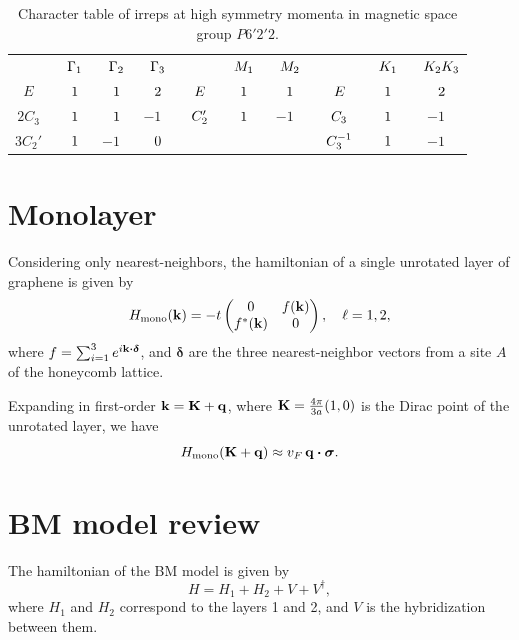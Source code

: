 \documentclass[12pt]{report}
\begin{document}
\begin{table}[H]
\caption{Character table of irreps at high symmetry momenta in magnetic space group $P6'2'2$.}
\centering
\begin{tabular} { c c c c | c c c | c c c }
\cline{1-10}
$\P$ & $\P \Gamma_1$ & $\P \Gamma_2$ & $\P \Gamma_3$ & $\P$ & $\P M_1$ & $\P M_2$ & $\P$ & $\P K_1$ & $\P K_2K_3$ \\
\cline{1-10}
$E$ & $\P1$ & $\P1$ & $\P2$ & $\P E$ & $\P1$ & $\P1$ & $\P E$ & $\P1$ & $\P2$ \\
$2 C_3$ & $\P1$ & $\P1$ & $ -1$ & $\P C_2'$ & $\P1$ & $ -1$ & $\P C_3$ & $\P1$ & $ -1$ \\
$3 C_2'$ & $\P1$ & $ -1$ & $\P0$ & $\P$ & $\P$ & $\P$ & $\P C_3^{-1}$ & $\P1$ & $-1$ \\
\cline{1-10}
\end{tabular}
\label{tab:P6'2'2}
\end{table}

\section{Monolayer}

Considering only nearest-neighbors, the hamiltonian of a single unrotated layer of graphene is given by
$$
H_{\text{mono}}({\vb{k}}) = -t
\begin{pmatrix}
0 & f({\vb{k}}) \\
f^*({\vb{k}}) & 0
\end{pmatrix}
, \quad \ell = 1, 2,
$$
where $f = \sum_{i=1}^{3} e^{i \k \vdot \bm{\delta}}$, and $\bm{\delta}$ are the three nearest-neighbor vectors from a site $A$ of the honeycomb lattice.

Expanding in first-order ${\vb{k}} = {\vb{K}} + {\vb{q}}$, where ${\vb{K}} = \frac{4\pi}{3a} (1, 0)$ is the Dirac point of the unrotated layer, we have
$$
H_{\text{mono}}(\K + \q) \approx v_F \, \q \vdot \bm{\sigma}.
$$

\section{BM model review}

The hamiltonian of the BM model is given by
$$
H = H_1 + H_2 + V + V^\dagger,
$$
where $H_1$ and $H_2$ correspond to the layers 1 and 2, and $V$ is the hybridization between them.
\end{document}
